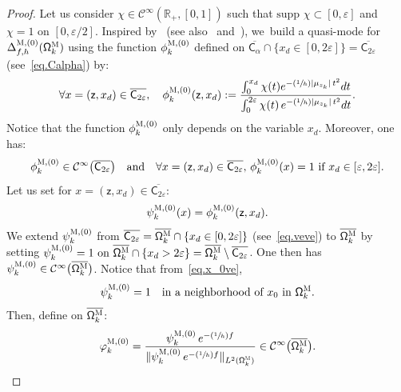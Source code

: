\documentclass[10pt]{amsart}
\newcommand{\Psfrac}[2]{(\sfrac{#1}{#2})}
\newcommand{\quand}{\quad\text{and}\quad}
\let\ve\varepsilon
\theoremstyle{plain}
\theoremstyle{definition}
\begin{document}
\begin{proof}
Let us consider $\chi\in\mathcal C^\infty(\mathbb R_+,[0,1])$ such that
$
\text{supp } \chi\subset [0, \ve]$ and $\chi=1 \text{ on } [0,\ve/2].
$
Inspired by~\cite{BEGK} (see also~\cite[\S4.2]{DoNe2} and~\cite{di2017small}), we~build a quasi-mode for $\Delta_{f,h}^{\textsc{M}, (0)}(\mathsf \Omega_k^{\textsc{M}})$ using the function $\phi_k^{\textsc{M},(0)}$ defined on $\overline{ \mathsf C_\alpha} \cap \{x_d \in [0,2\ve]\}= \overline {\mathsf C_{2\ve} }$ (see~\eqref{eq.Calpha}) by:
\begin{equation}\label{eq.phi=def}
\forall x = (\mathsf z,x_d) \in \overline {\mathsf C_{2\ve} }, \quad \phi^{\textsc{M},(0)}_k(\mathsf z,x_d):=\frac{ \int_0^{x_d}\chi(t)e^{-\Psfrac 1h\vert \mu_{z_k}\vert \, t^2} dt}{\int_0^{2\ve}\chi(t)\, e^{-\Psfrac 1h\vert \mu_{z_k}\vert \, t^2} dt}.
\end{equation}
Notice that the function $\phi^{\textsc{M},(0)}_k$ only depends on the variable $x_d$.
Moreover, one has:
\[
\phi^{\textsc{M},(0)}_{k}\in \mathcal C^\infty\bigl(\overline {\mathsf C_{2\ve} }\bigr) \quand 
\forall x = (\mathsf z,x_d) \in \overline {\mathsf C_{2\ve} },\, \phi^{\textsc{M},(0)}_k(x)=1 \text{ if } x_d \in [\ve,2\ve].
\]
Let us set for $x = (\mathsf z,x_d) \in \overline {\mathsf C_{2\ve}
}$:
\begin{equation}\label{eq.defPsi}
\psi^{\textsc{M},(0)}_k(x)= \phi^{\textsc{M},(0)}_k(\mathsf z,x_d).
\end{equation}
We extend $\psi^{\textsc{M},(0)}_k$ from $ \overline {\mathsf C_{2\ve} } =\overline {\mathsf \Omega_k^{\textsc{M}}}\cap \{ x_d \in [0,2\ve]\}$ (see~\eqref{eq.veve}) to $ \overline {\mathsf \Omega_k^{\textsc{M}}}$ by setting
$\psi^{\textsc{M},(0)}_k=1 \text{ on } \overline {\mathsf \Omega_k^{\textsc{M}}}\cap \{ x_d> 2\ve\}= \overline {\mathsf \Omega_k^{\textsc{M}}}\setminus \overline {\mathsf C_{2\ve} }$.
One then has $\psi^{\textsc{M},(0)}_k\in \mathcal C^\infty\bigl(\overline {\mathsf \Omega_k^{\textsc{M}}} \bigr)$.
Notice that from~\eqref{eq.x_0ve},
\begin{equation}\label{eq.psi=1x_0}
\psi^{\textsc{M},(0)}_k= 1 \quad\text{in a neighborhood of $x_0$ in $\mathsf \Omega_k^{\textsc{M}}$}.
\end{equation}
Then, define on $ \overline{\mathsf \Omega_k^{\textsc{M}}}$:
\begin{equation}\label{eq.QM-M0}
\varphi^{\textsc{M},(0)}_k=\frac{\psi^{\textsc{M},(0)}_k\, e^{-\Psfrac 1hf} }{ \Vert \psi^{\textsc{M},(0)}_k\, e^{-\Psfrac 1hf} \Vert_{L^2(\mathsf \Omega_k^{\textsc{M}})} } \in \mathcal C^\infty\bigl(\overline {\mathsf \Omega_k^{\textsc{M}}} \bigr).
\end{equation}


\end{proof}
\end{document}
